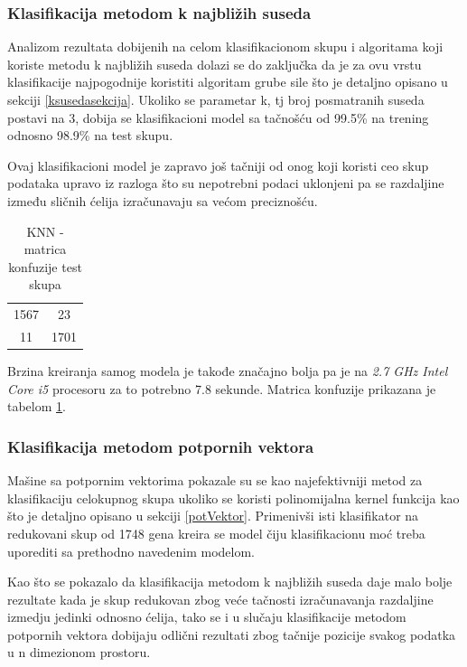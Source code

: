 \documentclass[a4paper]{article}
\begin{document}
\subsubsection{Klasifikacija metodom k najbližih suseda}

Analizom rezultata dobijenih na celom klasifikacionom skupu i algoritama koji koriste metodu k najbližih suseda dolazi se do zaključka da je za ovu vrstu klasifikacije najpogodnije koristiti algoritam grube sile što je detaljno opisano u sekciji \ref{ksusedasekcija}. Ukoliko se parametar k, tj broj posmatranih suseda postavi na 3, dobija se klasifikacioni model sa tačnošću od 99.5\% na trening odnosno 98.9\% na test skupu. 

Ovaj klasifikacioni model je zapravo još tačniji od onog koji koristi ceo skup podataka upravo iz razloga što su nepotrebni podaci uklonjeni pa se razdaljine između sličnih ćelija izračunavaju sa većom preciznošću.

\begin{table}[h!]
\centering
\begin{tabular}{|c c|}
  \hline
  1567 & 23 \\
  11 & 1701  \\
 \hline
\end{tabular}
\caption{KNN - matrica konfuzije test skupa}
\label{table:knnoo}
\end{table}

Brzina kreiranja samog modela je takođe značajno bolja pa je na  \textit{2.7 GHz Intel Core i5} procesoru za to potrebno 7.8 sekunde. Matrica konfuzije prikazana je tabelom \ref{table:knnoo}.

\subsubsection{Klasifikacija metodom
potpornih vektora}

Mašine sa potpornim vektorima pokazale su se kao 
najefektivniji metod za klasifikaciju celokupnog 
skupa ukoliko se koristi polinomijalna kernel 
funkcija kao što je detaljno opisano u sekciji 
\ref{potVektor}. Primenivši isti klasifikator na redukovani skup od 1748 gena kreira se model čiju klasifikacionu moć treba uporediti sa prethodno navedenim modelom. 

Kao što se pokazalo da klasifikacija metodom k najbližih suseda daje malo bolje rezultate kada je skup redukovan zbog veće tačnosti izračunavanja razdaljine izmedju jedinki odnosno ćelija, tako se i u slučaju klasifikacije metodom potpornih vektora dobijaju odlični rezultati zbog tačnije pozicije svakog podatka u n dimezionom prostoru.
\end{document}

